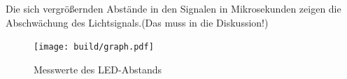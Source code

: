 \documentclass[captions=tableheading]{scrartcl}
\begin{document}
\begin{itemize}
\begin{figure}
            \end{figure}
        Die sich vergrößernden Abstände in den Signalen in Mikrosekunden zeigen die Abschwächung des Lichtsignals.(Das muss in die Diskussion!)
            \begin{figure}
                \centering
                \texttt{[image: build/graph.pdf]}
                \caption{Messwerte des LED-Abstands}
                \label{fig:graph}
            \end{figure}
            
    \end{itemize}
\end{document}
